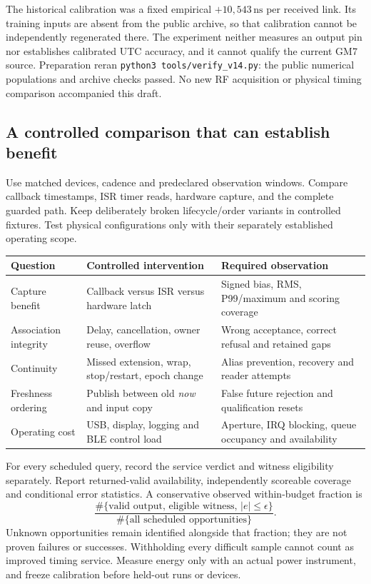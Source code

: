 \documentclass[10pt,letterpaper]{article}
\newcommand{\src}[1]{\nolinkurl{#1}}
\newcommand{\ns}{\,\mathrm{ns}}
\begin{document}
The historical calibration was a fixed empirical $+10{,}543\ns$ per received link. Its training inputs are absent from the public archive, so that calibration cannot be independently regenerated there. The experiment neither measures an output pin nor establishes calibrated UTC accuracy, and it cannot qualify the current GM7 source. Preparation reran \src{python3 tools/verify_v14.py}: the public numerical populations and archive checks passed. No new RF acquisition or physical timing comparison accompanied this draft.

\subsection{A controlled comparison that can establish benefit}
Use matched devices, cadence and predeclared observation windows. Compare callback timestamps, ISR timer reads, hardware capture, and the complete guarded path. Keep deliberately broken lifecycle/order variants in controlled fixtures. Test physical configurations only with their separately established operating scope.

\begin{center}\small
\begin{tabular}{L{.24\linewidth}L{.35\linewidth}L{.32\linewidth}}\toprule
Question & Controlled intervention & Required observation\\\midrule
Capture benefit & Callback versus ISR versus hardware latch & Signed bias, RMS, P99/maximum and scoring coverage\\
Association integrity & Delay, cancellation, owner reuse, overflow & Wrong acceptance, correct refusal and retained gaps\\
Continuity & Missed extension, wrap, stop/restart, epoch change & Alias prevention, recovery and reader attempts\\
Freshness ordering & Publish between old \emph{now} and input copy & False future rejection and qualification resets\\
Operating cost & USB, display, logging and BLE control load & Aperture, IRQ blocking, queue occupancy and availability\\\bottomrule
\end{tabular}
\end{center}
\vspace{-4pt}
For every scheduled query, record the service verdict and witness eligibility separately. Report returned-valid availability, independently scoreable coverage and conditional error statistics. A conservative observed within-budget fraction is
\[
 \frac{\#\{\text{valid output, eligible witness, }|e|\le\epsilon\}}
      {\#\{\text{all scheduled opportunities}\}} .
\]
Unknown opportunities remain identified alongside that fraction; they are not proven failures or successes. Withholding every difficult sample cannot count as improved timing service. Measure energy only with an actual power instrument, and freeze calibration before held-out runs or devices.
\end{document}
